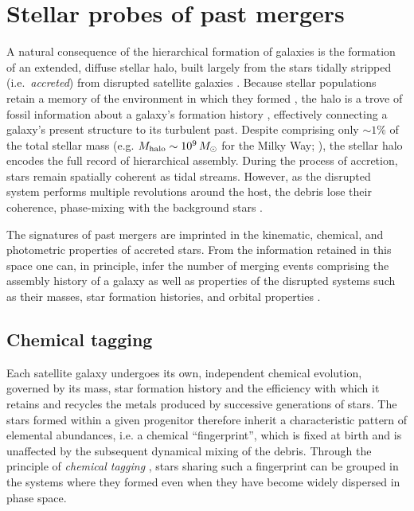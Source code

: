 \section{Stellar probes of past mergers}
\label{sec:intro_lcdm}


A natural consequence of the hierarchical formation of galaxies is the formation of an extended, diffuse stellar halo,
built largely from the stars tidally stripped (i.e.\ \textit{accreted}) from disrupted satellite galaxies \citep{Bullock2005,Cooper2010}. Because stellar populations retain
a memory of the environment in which they formed \citep{Eggen1962,Searle1978}, the halo is a trove of fossil
information about a galaxy's formation history \citep{Helmi2020,Deason2024}, effectively connecting a galaxy's present structure to its turbulent past.
Despite comprising only $\sim 1\%$ of the total stellar mass (e.g. $M_{\rm halo} \sim 10^9\,M_\odot$ for the Milky Way; 
\citealt{Deason2019,Mackereth2020}), the stellar halo encodes the full record of hierarchical assembly.
During the process of accretion, stars remain spatially coherent as tidal streams. However, as the disrupted system performs 
multiple revolutions around the host, the debris lose their coherence, phase-mixing with the background stars \citep{Tremaine1999,Binney2008}. 

The signatures of past mergers are imprinted in the kinematic, chemical, and photometric properties of accreted stars. 
From the information retained in this space one can, in principle, infer the number of merging
events comprising the assembly history of a galaxy as well as properties of the disrupted systems such as their masses, 
star formation histories, and orbital properties \citep{Freeman2002}. 

\subsection{Chemical tagging}

Each satellite galaxy undergoes its own, independent chemical evolution, governed by its mass, 
star formation history and the efficiency with which it retains and recycles the metals produced by successive generations 
of stars. The stars formed within a given progenitor therefore inherit a characteristic pattern of elemental abundances, i.e.
a chemical ``fingerprint'', which is fixed at birth and is unaffected by the subsequent dynamical mixing of the debris. 
Through the principle of \textit{chemical tagging} \citep{Freeman2002}, stars sharing such a fingerprint can be grouped 
in the systems where they formed even when they have become widely dispersed in phase space. 

